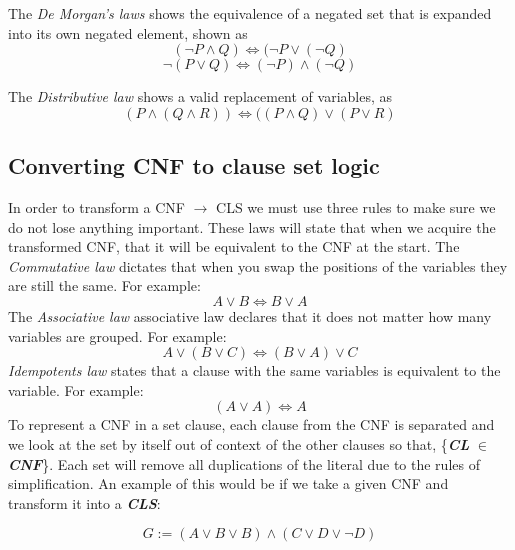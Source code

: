 \documentclass[11pt,a4paper]{article}
\begin{document}
The \emph{De Morgan's laws} shows the equivalence of a negated set that is expanded into its own negated element, shown as
\begin{displaymath}
(\neg P \land Q) \Leftrightarrow (\neg P \lor (\neg Q)
\end{displaymath}  
\begin{displaymath}
\neg(P \lor Q) \Leftrightarrow (\neg P) \land (\neg Q)
\end{displaymath}


The \emph{Distributive law} shows a valid replacement of variables, as
\begin{displaymath}
(P \land (Q \land R)) \Leftrightarrow ((P \land Q) \lor (P \lor R)
\end{displaymath}


\subsection{Converting CNF to clause set logic}
In order to transform a CNF $\rightarrow$ CLS we must use three rules to make sure we do not lose anything important. These laws will state that when we acquire the transformed CNF, that it will be equivalent to the CNF at the start. 
The \emph{Commutative law} dictates that when you swap the positions of the variables they are still the same. For example:
\begin{displaymath}
A \lor B \Leftrightarrow B \lor A
\end{displaymath}
The \emph{Associative law} associative law declares that it does not matter how many variables are grouped. For example:
\begin{displaymath}
A \lor (B \lor C) \Leftrightarrow (B \lor A) \lor C
\end{displaymath}
\emph{Idempotents law} states that a clause with the same variables is equivalent to the variable. For example:
\begin{displaymath}
(A \lor A) \Leftrightarrow A
\end{displaymath}
To represent a CNF in a set clause, each clause from the CNF is separated and we look at the set by itself out of context of the other clauses so that, \{\textbf{\textit{CL}} $\in$ \textbf{\textit{CNF}}\}. Each set will remove all duplications of the literal due to the rules of simplification. An example of this would be if we take a given CNF and transform it into a \textbf{\textit{CLS}}: 

\begin{displaymath}
G:= (A \lor B \lor B) \land (C \lor D \lor \neg D)
\end{displaymath}
\end{document}
